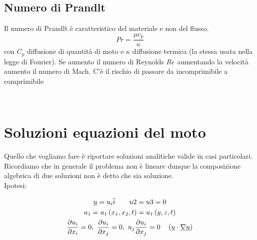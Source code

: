 \subsection{Numero di Prandlt}
Il numero di Prandlt è caratteristico del materiale e non del flusso. 
\begin{equation}
  \label{eq:num_prandlt}
  Pr = \frac{{\mu c_p}}{\kappa }
\end{equation}
con $ C_p $ diffusione di quantità di moto e $ \kappa  $ diffusione termica (la stessa usata nella legge di Fourier).
\vspace{1ex}
\hline
\vspace{1ex}
Se aumento il numero di Reynolds $ Re $ aumentando la velocità aumento il numero di Mach. C'è il rischio di passare da incomprimibile a comprimibile

\\
\hline
\vspace{1ex}

\section{Soluzioni equazioni del moto}
Quello che vogliamo fare è riportare soluzioni analitiche valide in casi particolari.
Ricordiamo che in generale il problema non è lineare dunque la composizione algebrica di due soluzioni non è detto che sia soluzione.\\
Ipotesi:

  \begin{gather*}
    \underline{u} = u_i \hat{i}\qquad u2 = u3 =0\\
    u_1 = u_1\left( x_1,x_2,t\right)  = u_1\left( y,z,t\right) \\
    \frac{\partial u_i}{\partial x_i}=0,\,\,\frac{\partial u_i}{\partial x_j}=0,\,\,u_j\frac{\partial u_i}{\partial x_j}=0 \quad \left( \underline{u}\cdot \underline{\nabla} \underline{u}\right) 
  \end{gather*} 

